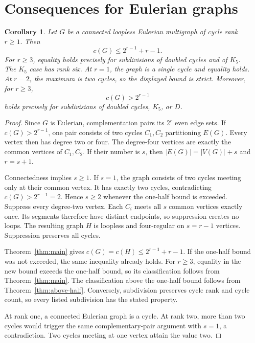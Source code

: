 \documentclass[11pt]{article}
\newtheorem{corollary}[theorem]{Corollary}
\begin{document}
\section{Consequences for Eulerian graphs}

\begin{corollary}\label{cor:eulerian}
Let $G$ be a connected loopless Eulerian multigraph of cycle rank $r\ge1$.
Then
\[
 c(G)\le2^{r-1}+r-1.
\]
For $r\ge3$, equality holds precisely for subdivisions of doubled cycles and of $K_5$.
The $K_5$ case has rank six.
At $r=1$, the graph is a single cycle and equality holds.
At $r=2$, the maximum is two cycles, so the displayed bound is strict.
Moreover, for $r\ge3$,
\[
 c(G)>2^{r-1}
\]
holds precisely for subdivisions of doubled cycles, $K_5$, or $D$.
\end{corollary}

\begin{proof}
Since $G$ is Eulerian, complementation pairs its $2^r$ even edge sets.
If $c(G)>2^{r-1}$, one pair consists of two cycles $C_1,C_2$ partitioning $E(G)$.
Every vertex then has degree two or four.
The degree-four vertices are exactly the common vertices of $C_1,C_2$.
If their number is $s$, then $|E(G)|=|V(G)|+s$ and $r=s+1$.

Connectedness implies $s\ge1$.
If $s=1$, the graph consists of two cycles meeting only at their common vertex.
It has exactly two cycles, contradicting $c(G)>2^{r-1}=2$.
Hence $s\ge2$ whenever the one-half bound is exceeded.
Suppress every degree-two vertex.
Each $C_i$ meets all $s$ common vertices exactly once.
Its segments therefore have distinct endpoints, so suppression creates no loops.
The resulting graph $H$ is loopless and four-regular on $s=r-1$ vertices.
Suppression preserves all cycles.

Theorem~\ref{thm:main} gives
$c(G)=c(H)\le2^{r-1}+r-1$.
If the one-half bound was not exceeded, the same inequality already holds.
For $r\ge3$, equality in the new bound exceeds the one-half bound, so its classification follows from Theorem~\ref{thm:main}.
The classification above the one-half bound follows from Theorem~\ref{thm:above-half}.
Conversely, subdivision preserves cycle rank and cycle count, so every listed subdivision has the stated property.

At rank one, a connected Eulerian graph is a cycle.
At rank two, more than two cycles would trigger the same complementary-pair argument with $s=1$, a contradiction.
Two cycles meeting at one vertex attain the value two.
\end{proof}
\end{document}
